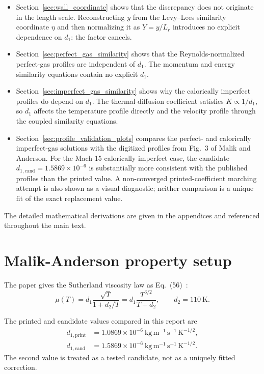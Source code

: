 \documentclass[11pt]{article}
\newcommand{\MA}{Malik-Anderson}
\begin{document}
\begin{itemize}
    \item Section~\ref{sec:wall_coordinate} shows that the discrepancy does not originate in the length scale. Reconstructing $y$ from the Levy--Lees similarity coordinate $\eta$ and then normalizing it as $Y=y/L_r$ introduces no explicit dependence on $d_1$: the factor cancels.
    \item Section~\ref{sec:perfect_gas_similarity} shows that the Reynolds-normalized perfect-gas profiles are independent of $d_1$. The momentum and energy similarity equations contain no explicit $d_1$.
    \item Section~\ref{sec:imperfect_gas_similarity} shows why the calorically imperfect profiles do depend on $d_1$. The thermal-diffusion coefficient satisfies $K\propto 1/d_1$, so $d_1$ affects the temperature profile directly and the velocity profile through the coupled similarity equations.
    \item Section~\ref{sec:profile_validation_plots} compares the perfect- and calorically imperfect-gas solutions with the digitized profiles from Fig.~3 of Malik and Anderson. For the Mach-15 calorically imperfect case, the candidate $d_{1,\mathrm{cand}}=1.5869\times10^{-6}$ is substantially more consistent with the published profiles than the printed value. A non-converged printed-coefficient marching attempt is also shown as a visual diagnostic; neither comparison is a unique fit of the exact replacement value.
\end{itemize}

The detailed mathematical derivations are given in the appendices and referenced throughout the main text.

\section{\MA{} property setup}
\label{sec:property_setup}

The paper gives the Sutherland viscosity law as Eq.~(56)~\cite{malik1991}:
\begin{equation}
  \mu(T)
  = d_1 \frac{\sqrt{T}}{1+d_2/T}
  = d_1 \frac{T^{3/2}}{T+d_2},
  \qquad d_2 = 110~\mathrm{K}.
  \label{eq:sutherland}
\end{equation}

The printed and candidate values compared in this report are
\begin{align}
  d_{1,\mathrm{print}}&=1.0869\times10^{-6}~\mathrm{kg\,m^{-1}\,s^{-1}\,K^{-1/2}},\\
  d_{1,\mathrm{cand}}&=1.5869\times10^{-6}~\mathrm{kg\,m^{-1}\,s^{-1}\,K^{-1/2}}.
\end{align}
The second value is treated as a tested candidate, not as a uniquely fitted correction.
\end{document}
